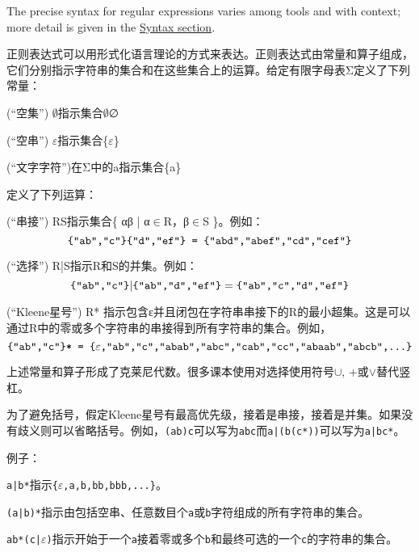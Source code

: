 The precise syntax for regular expressions varies among tools and with context; more detail is given in the \hyperref[regular_expression_syntax]{Syntax section}.


正则表达式可以用形式化语言理论的方式来表达。正则表达式由常量和算子组成，它们分别指示字符串的集合和在这些集合上的运算。给定有限字母表Σ定义了下列常量：

\begin{compactitem}
\item (“空集”) $\emptyset$指示集合$\emptyset$∅
\item (“空串”) $\varepsilon$指示集合\{$\varepsilon$\}
\item (“文字字符”)在Σ中的a指示集合\{a\}
\end{compactitem}

定义了下列运算：


\begin{compactitem}
\item (“串接”) RS指示集合\{ αβ | α$\in$R，β$\in$S \}。例如：$$\text{\texttt{\{"ab","c"\}\{"d","ef"\} = \{"abd","abef","cd","cef"\}}}$$




\item (“选择”) R|S指示R和S的并集。例如：$$\text{\texttt{\{"ab","c"\}}|\texttt{\{"ab","d","ef"\}}}=\texttt{\{"ab","c","d","ef"\}}$$



\item (“Kleene星号”) R* 指示包含ε并且闭包在字符串串接下的R的最小超集。这是可以通过R中的零或多个字符串的串接得到所有字符串的集合。例如，$$\text{\texttt{\{"ab","c"\}* = \{}} \varepsilon \text{\texttt{,"ab","c","abab","abc","cab","cc","abaab","abcb",...\}}}$$



\end{compactitem}


上述常量和算子形成了克莱尼代数。很多课本使用对选择使用符号$\cup$, $+$或$\vee$替代竖杠。

为了避免括号，假定Kleene星号有最高优先级，接着是串接，接着是并集。如果没有歧义则可以省略括号。例如，\texttt{(ab)c}可以写为\texttt{abc}而\texttt{a|(b(c*))}可以写为\texttt{a|bc*}。

例子：

\begin{compactitem}
\item \texttt{a|b*}指示\texttt{\{$\varepsilon$,a,b,bb,bbb,...\}}。
\item \texttt{(a|b)*}指示由包括空串、任意数目个\texttt{a}或\texttt{b}字符组成的所有字符串的集合。
\item \texttt{ab*(c|$\varepsilon$)}指示开始于一个\texttt{a}接着零或多个\texttt{b}和最终可选的一个\texttt{c}的字符串的集合。
\end{compactitem}



